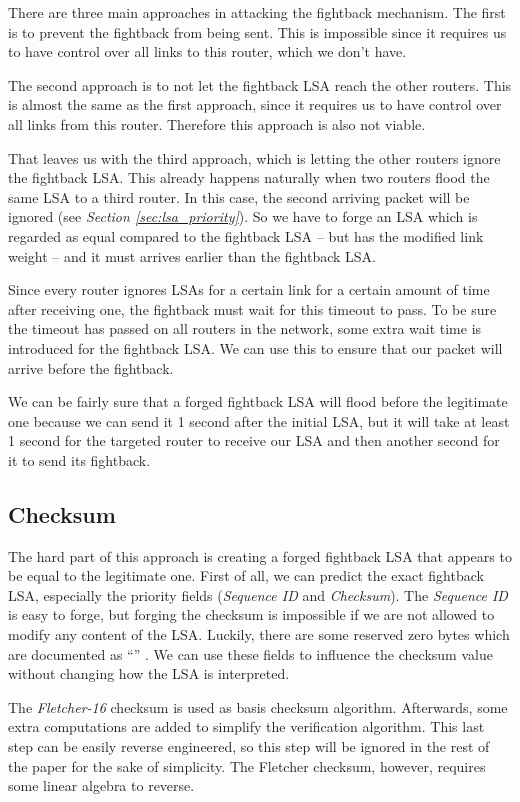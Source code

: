 \documentclass[11pt,a4paper,oneside]{article}
\newcommand{\lsubsection}[2]{\subsection{#1}\label{sec:#2}}
\begin{document}
    There are three main approaches in attacking the fightback mechanism.
    The first is to prevent the fightback from being sent.
    This is impossible since it requires us to have control over all links to this router, which we don't have.

    The second approach is to not let the fightback LSA reach the other routers.
    This is almost the same as the first approach, since it requires us to have control over all links from this router.
    Therefore this approach is also not viable.

    That leaves us with the third approach, which is letting the other routers ignore the fightback LSA.
    This already happens naturally when two routers flood the same LSA to a third router.
    In this case, the second arriving packet will be ignored (see \textit{Section \ref{sec:lsa_priority}}).
    So we have to forge an LSA which is regarded as equal compared to the fightback LSA -- but has the modified link weight -- and it must arrives earlier than the fightback LSA.

    Since every router ignores LSAs for a certain link for a certain amount of time after receiving one, the fightback must wait for this timeout to pass.
    To be sure the timeout has passed on all routers in the network, some extra wait time is introduced for the fightback LSA. We can use this to ensure that our packet will arrive before the fightback.

    We can be fairly sure that a forged fightback LSA will flood before the legitimate one because we can send it 1 second after the initial LSA, but it will take at least 1 second for the targeted router to receive our LSA and then another second for it to send its fightback.

    \lsubsection{Checksum}{checksum}
    The hard part of this approach is creating a forged fightback LSA that appears to be equal to the legitimate one.
    First of all, we can predict the exact fightback LSA, especially the priority fields (\textit{Sequence ID} and \textit{Checksum}).
    The \textit{Sequence ID} is easy to forge, but forging the checksum is impossible if we are not allowed to modify any content of the LSA.
    Luckily, there are some reserved zero bytes which are documented as ``'' \cite[appendix A.3.1]{rfc-5340}.
    We can use these fields to influence the checksum value without changing how the LSA is interpreted.

    The \textit{Fletcher-16}\cite{fletcher} checksum is used as basis checksum algorithm.
    Afterwards, some extra computations are added to simplify the verification algorithm.
    This last step can be easily reverse engineered, so this step will be ignored in the rest of the paper for the sake of simplicity.
    The Fletcher checksum, however, requires some linear algebra to reverse.
\end{document}
